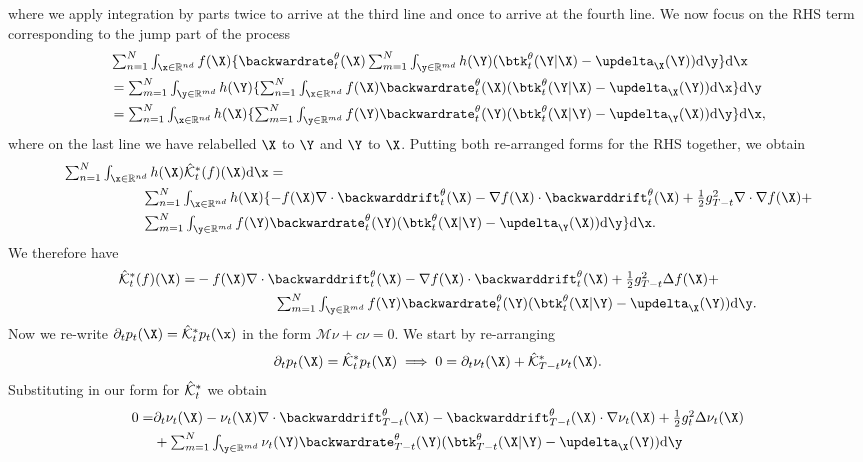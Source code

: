 where we apply integration by parts twice to arrive at the third line and once to arrive at the fourth line. We now focus on the RHS term corresponding to the jump part of the process
\begin{align}
    &\textstyle \intx f(\X) \{ \backwardrate_t^\theta(\X) \inty h(\Y) ( \btk_t^\theta(\Y | \X) - \updelta_{\X}(\Y) ) \rmd \y \} \rmd \x \\
    &\textstyle =\inty h(\Y) \{ \intx f(\X) \backwardrate_t^\theta(\X) ( \btk_t^\theta(\Y | \X) - \updelta_{\X}(\Y) ) \rmd \x \} \rmd \y\\
    &\textstyle =\intx h(\X) \{ \inty f(\Y) \backwardrate_t^\theta(\Y) ( \btk_t^\theta(\X | \Y) - \updelta_{\Y}(\X) ) \rmd \y \} \rmd \x , 
\end{align}
where on the last line we have relabelled $\X$ to $\Y$ and $\Y$ to $\X$. Putting both re-arranged forms for the RHS together, we obtain
\begin{align}
    &\textstyle \intx h(\X) \hat{\mathcal{K}}_t^*(f)(\X) \rmd \x  = \\
    &\textstyle \hspace{2cm} \intx h(\X) \{ -f(\X) \nabla \cdot \backwarddrift_t^\theta(\X) - \nabla f(\X) \cdot \backwarddrift_t^\theta(\X) + \frac{1}{2} g_{T-t}^2 \nabla \cdot \nabla f (\X) + \\
    &\textstyle  \hspace{2cm} \inty f(\Y) \backwardrate_t^\theta(\Y) ( \btk_t^\theta(\X | \Y) - \updelta_{\Y}(\X) ) \rmd \y  \} \rmd \x . 
\end{align}
We therefore have
\begin{align}
    \adjointK_t(f)(\X) =&\textstyle   -f(\X) \nabla \cdot \backwarddrift_t^\theta(\X) - \nabla f(\X) \cdot \backwarddrift_t^\theta(\X) + \frac{1}{2} g_{T-t}^2 \Delta f(\X) + \\
    &\textstyle  \hspace{2cm} \inty f(\Y) \backwardrate_t^\theta(\Y) ( \btk_t^\theta(\X | \Y) - \updelta_{\X}(\Y) ) \rmd \y . 
\end{align}
Now we re-write $\partial_t p_t(\X) = \adjointK_t p_t(\x)$ in the form $\mathcal{M}\nu + c \nu = 0$. We start by re-arranging
\begin{equation}
\partial_t p_t(\X) = \adjointK_t p_t(\X) \implies 0 = \partial_t \nu_t(\X) + \adjointK_{T-t} \nu_t(\X) . 
\end{equation}
Substituting in our form for $\hat{\mathcal{K}}^*_t$ we obtain
\begin{align}
    0 = &\textstyle \partial_t \nu_t(\X) -  \nu_t(\X) \nabla \cdot \backwarddrift_{T-t}^\theta(\X) - \backwarddrift_{T-t}^\theta(\X) \cdot \nabla \nu_t(\X) + \frac{1}{2}g_{t}^2 \Delta \nu_t(\X)\\
    &\textstyle  + \inty \nu_t(\Y) \backwardrate_{T-t}^\theta(\Y) ( \btk_{T-t}^\theta(\X | \Y) - \updelta_{\X}(\Y) ) \rmd\y
\label{eq:assm1LHS}
\end{align}


